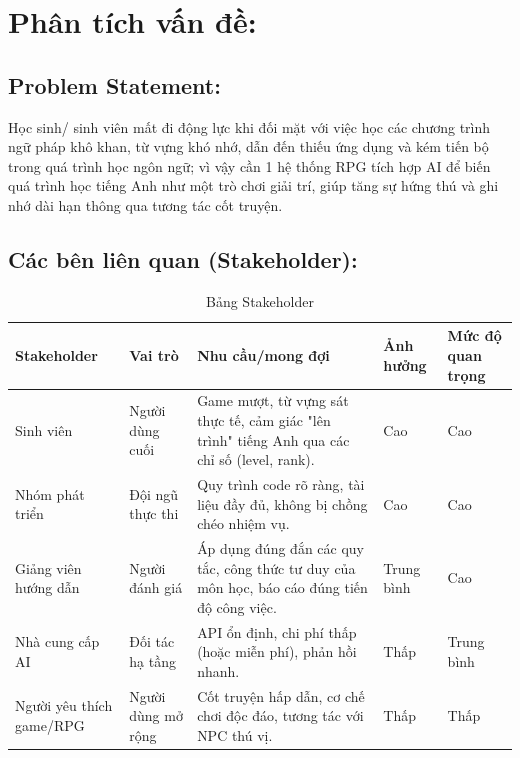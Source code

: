 \section{Phân tích vấn đề:}
\subsection{Problem Statement:}
Học sinh/ sinh viên mất đi động lực khi đối mặt với việc học các chương trình ngữ pháp khô khan, từ vựng khó nhớ, dẫn đến thiếu ứng dụng và kém tiến bộ trong quá trình học ngôn ngữ; vì vậy cần 1 hệ thống RPG tích hợp AI để biến quá trình học tiếng Anh như một trò chơi giải trí, giúp tăng sự hứng thú và ghi nhớ dài hạn thông qua tương tác cốt truyện.

\subsection{Các bên liên quan (Stakeholder):}


\begin{table}[H]
    \centering
    \renewcommand{\arraystretch}{1.5} %
    \caption{Bảng Stakeholder}
    \label{tab:stakeholder}
    \begin{tabular}{|L{3cm}|L{2.5cm}|L{5.5cm}|C{1.5cm}|C{1.8cm}|}
        \hline
        \textbf{Stakeholder} & \textbf{Vai trò} & \textbf{Nhu cầu/mong đợi} & \textbf{Ảnh hưởng} & \textbf{Mức độ quan trọng} \\ \hline
        Sinh viên & Người dùng cuối & Game mượt, từ vựng sát thực tế, cảm giác "lên trình" tiếng Anh qua các chỉ số (level, rank). & Cao & Cao \\ \hline
        Nhóm phát triển & Đội ngũ thực thi & Quy trình code rõ ràng, tài liệu đầy đủ, không bị chồng chéo nhiệm vụ. & Cao & Cao \\ \hline
        Giảng viên hướng dẫn & Người đánh giá & Áp dụng đúng đắn các quy tắc, công thức tư duy của môn học, báo cáo đúng tiến độ công việc. & Trung bình & Cao \\ \hline
        Nhà cung cấp AI & Đối tác hạ tầng & API ổn định, chi phí thấp (hoặc miễn phí), phản hồi nhanh. & Thấp & Trung bình \\ \hline
        Người yêu thích game/RPG & Người dùng mở rộng & Cốt truyện hấp dẫn, cơ chế chơi độc đáo, tương tác với NPC thú vị. & Thấp & Thấp \\ \hline
    \end{tabular}
\end{table}

